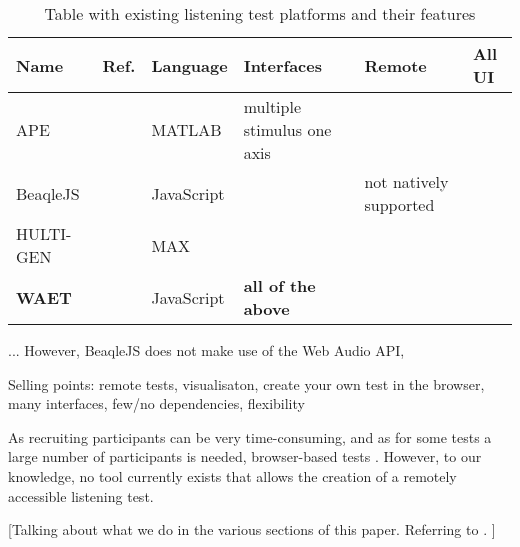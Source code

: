\documentclass{sig-alternate}
\begin{document}
	\begin{table*}[ht]
        \caption{Table with existing listening test platforms and their features}
        \begin{center}
        	\begin{tabular}{|*{6}{l|}}
        		\hline
        		\textbf{Name} 	& \textbf{Ref.} 	& \textbf{Language} 	& \textbf{Interfaces} 			& \textbf{Remote} 			& \textbf{All UI} 	\\
        		\hline
        		APE 			& \cite{ape}		& MATLAB				& multiple stimulus one axis 	& 							& 			\\
        		BeaqleJS		& \cite{beaqlejs}	& JavaScript			& 								& not natively supported 	& \\
        		HULTI-GEN 		& \cite{hultigen}	& MAX 					& 								& 							& \checkmark \\
        		\textbf{WAET}	& \cite{waet}		& JavaScript			& \textbf{all of the above}		& \checkmark				& \checkmark \\
        		\hline
        	\end{tabular}
        \end{center}
        \label{tab:toolboxes}
        \end{table*}%

        ... However, BeaqleJS \cite{beaqlejs} does not make use of the Web Audio API, %

        Selling points: remote tests, visualisaton, create your own test in the browser, many interfaces, few/no dependencies, flexibility

        As recruiting participants can be very time-consuming, and as for some tests a large number of participants is needed, browser-based tests \cite{schoeffler2015mushra}. However, to our knowledge, no tool currently exists that allows the creation of a remotely accessible listening test. %

        [Talking about what we do in the various sections of this paper. Referring to \cite{waet}. ]

\end{document}
